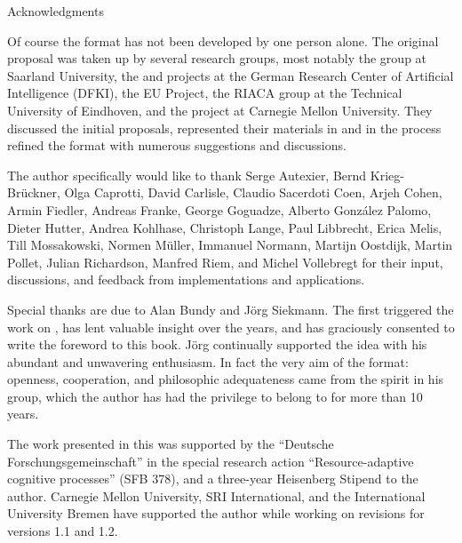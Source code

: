 
\begin{omgroup}[display=flow]{Acknowledgments}

  \thispagestyle{empty} Of course the {\omdoc}
  format has not been developed by one person alone. The original proposal was taken up by
  several research groups, most notably the {\OMEGA} group at Saarland University, the
  {\maya} and {\activemath} projects at the German Research Center of Artificial
  Intelligence (DFKI), the {} EU Project, the RIACA group at the Technical
  University of Eindhoven, and the {} project at Carnegie Mellon
  University.  They discussed the initial proposals, represented their materials in
  {\omdoc} and in the process refined the format with numerous suggestions and
  discussions.

  The author specifically would like to thank Serge Autexier, Bernd Krieg-Br\"uckner, Olga
  Caprotti, David Carlisle, Claudio Sacerdoti Coen, Arjeh Cohen, Armin Fiedler, Andreas
  Franke, George Goguadze, Alberto Gonz\'alez Palomo, Dieter Hutter, Andrea Kohlhase,
  Christoph Lange, Paul Libbrecht, Erica Melis, Till Mossakowski, Normen M\"uller,
  Immanuel Normann, Martijn Oostdijk, Martin Pollet, Julian Richardson, Manfred Riem, and
  Michel Vollebregt for their input, discussions, and feedback from implementations and
  applications.

  Special thanks are due to Alan Bundy and J\"org Siekmann. The first triggered the work
  on {\omdoc}, has lent valuable insight over the years, and has graciously consented to
  write the foreword to this book. J\"org continually supported the {\omdoc} idea with his
  abundant and unwavering enthusiasm. In fact the very aim of the {\omdoc} format:
  openness, cooperation, and philosophic adequateness came from the spirit in his {\OMEGA}
  group, which the author has had the privilege to belong to for more than 10 years.

  The work presented in this {\report} was supported by the ``Deutsche
  For\-schungs\-gemeinschaft'' in the special research action ``Resource-adaptive
  cognitive processes'' (SFB 378), and a three-year Heisenberg Stipend to the author.
  Carnegie Mellon University, SRI International, and the International University Bremen
  have supported the author while working on revisions for versions 1.1 and 1.2.
\end{omgroup}

